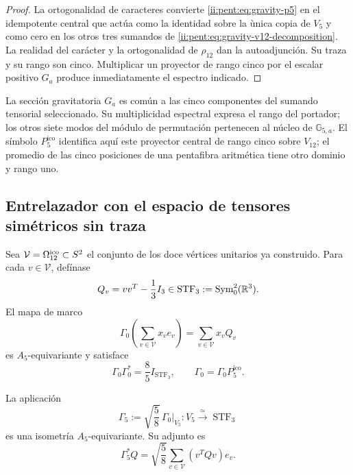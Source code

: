 \begin{proof}
La ortogonalidad de caracteres convierte \eqref{ii:pent:eq:gravity-p5} en el
idempotente central que act\'ua como la identidad sobre la \`unica copia de
\(V_5\) y como cero en los otros tres sumandos de
\eqref{ii:pent:eq:gravity-v12-decomposition}. La realidad del car\'acter y la
ortogonalidad de \(\rho_{12}\) dan la autoadjunci\'on. Su traza y su rango
son cinco. Multiplicar un proyector de rango cinco por el escalar positivo
\(G_a\) produce inmediatamente el espectro indicado.
\end{proof}

La sección gravitatoria \(G_a\) es común a las cinco componentes del
sumando tensorial seleccionado. Su multiplicidad espectral expresa el
rango del portador; los otros siete modos del módulo de permutación
pertenecen al núcleo de \(\mathbb G_{5,a}\). El símbolo
\(P^{\mathrm{ico}}_5\) identifica aquí este proyector central de rango
cinco sobre \(V_{12}\); el promedio de las cinco posiciones de una
pentafibra aritmética tiene otro dominio y rango uno.

\subsection{Entrelazador con el espacio de tensores sim\'etricos sin traza}

Sea \(\mathcal V=\Omega_{12}^{\rm ico}\subset S^2\) el conjunto de los
doce vértices unitarios ya construido. Para cada \(v\in\mathcal V\), def\'inase
\begin{equation}
\label{ii:pent:eq:gravity-Qv}
Q_v=vv^T-\frac13I_3\in
\operatorname{STF}_3:=\operatorname{Sym}^2_0(\mathbb R^3).
\end{equation}
El mapa de marco
\begin{equation}
\label{ii:pent:eq:gravity-Gamma0}
\Gamma_0\!\left(\sum_{v\in\mathcal V}x_ve_v\right)
=\sum_{v\in\mathcal V}x_vQ_v
\end{equation}
es \(A_5\)-equivariante y satisface
\begin{equation}
\label{ii:pent:eq:gravity-tight-frame}
\Gamma_0\Gamma_0^*=\frac85I_{\operatorname{STF}_3},
\qquad
\Gamma_0=\Gamma_0P^{\mathrm{ico}}_5.
\end{equation}

\begin{theorem}
\label{ii:pent:thm:gravity-gamma5}
La aplicaci\'on
\begin{equation}
\label{ii:pent:eq:gravity-gamma5}
\boxed{
\Gamma_5:=\sqrt{\frac58}\,\Gamma_0|_{V_5}:
V_5\xrightarrow{\ \simeq\ }\operatorname{STF}_3}
\end{equation}
es una isometr\'ia \(A_5\)-equivariante. Su adjunto es
\begin{equation}
\label{ii:pent:eq:gravity-gamma5-adjoint}
\Gamma_5^*Q=\sqrt{\frac58}
\sum_{v\in\mathcal V}(v^TQv)e_v.
\end{equation}
\end{theorem}


